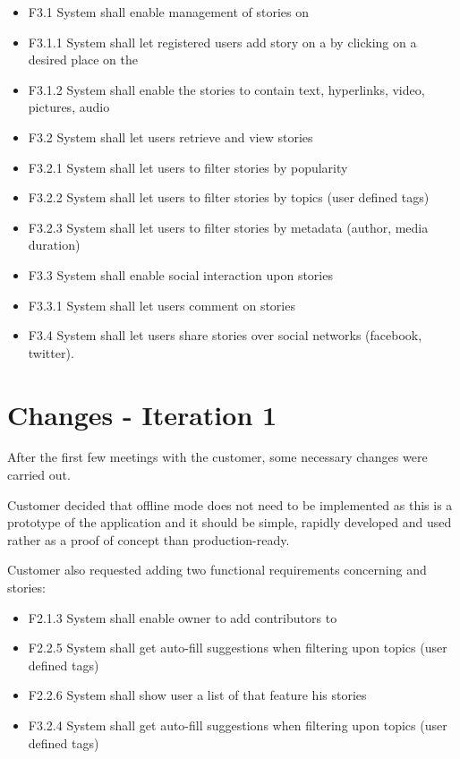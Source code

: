 \documentclass[11pt]{book}
\begin{document}
\begin{itemize}
  \item F3.1 System shall enable management of stories on \wallentityp
  \item F3.1.1 System shall let registered users add story on a \wallentitys by clicking on a desired place on the \wallentitys
  \item F3.1.2 System shall enable the stories to contain text, hyperlinks, video, pictures, audio
  \item F3.2 System shall let users retrieve and view stories
  \item F3.2.1 System shall let users to filter stories by popularity
  \item F3.2.2 System shall let users to filter stories by topics (user defined tags)
  \item F3.2.3 System shall let users to filter stories by metadata (author, media duration)
  \item F3.3 System shall enable social interaction upon stories
  \item F3.3.1 System shall let users comment on stories
  \item F3.4 System shall let users share stories over social networks (facebook, twitter).
\end{itemize}

\section{Changes - Iteration 1}\label{changes---iteration-1}

After the first few meetings with the customer, some necessary changes were carried out.

Customer decided that offline mode does not need to be implemented as this is a prototype of the application and it should be simple, rapidly developed and used rather as a proof of concept than production-ready.

Customer also requested adding two functional requirements concerning
\wallentityp and stories:

\begin{itemize}
  \item F2.1.3 System shall enable owner to add contributors to \wallentitys
  \item F2.2.5 System shall get auto-fill suggestions when filtering upon topics (user defined tags)
  \item F2.2.6 System shall show user a list of \wallentityp that feature his stories
  \item F3.2.4 System shall get auto-fill suggestions when filtering upon topics (user defined tags)
\end{itemize}
\end{document}

